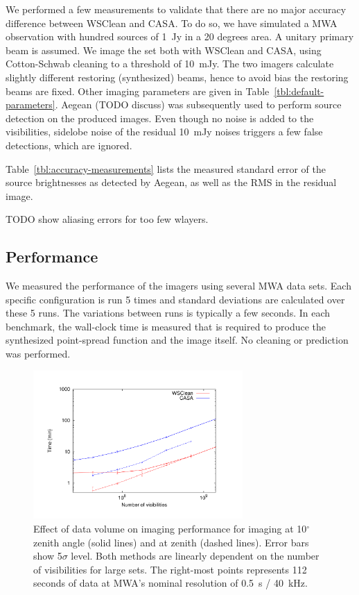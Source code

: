 \documentclass[useAMS,usenatbib]{mn2e}
\newcommand{\degree}{\ensuremath{^{\circ}}\xspace}
\begin{document}
We performed a few measurements to validate that there are no major accuracy difference between WSClean and CASA. To do so, we have simulated a MWA observation with hundred sources of 1~Jy in a 20 degrees area. A unitary primary beam is assumed. We image the set both with WSClean and CASA, using Cotton-Schwab cleaning to a threshold of 10~mJy. The two imagers calculate slightly different restoring (synthesized) beams, hence to avoid bias the restoring beams are fixed. Other imaging parameters are given in Table~\ref{tbl:default-parameters}. Aegean (TODO discuss) was subsequently used to perform source detection on the produced images. Even though no noise is added to the visibilities, sidelobe noise of the residual 10~mJy noises triggers a few false detections, which are ignored.

Table~\ref{tbl:accuracy-measurements} lists the measured standard error of the source brightnesses as detected by Aegean, as well as the RMS in the residual image.

TODO show aliasing errors for too few wlayers.

\subsection{Performance}
We measured the performance of the imagers using several MWA data sets. Each specific configuration is run 5 times and standard deviations are calculated over these 5 runs. The variations between runs is typically a few seconds. In each benchmark, the wall-clock time is measured that is required to produce the synthesized point-spread function and the image itself. No cleaning or prediction was performed.

\begin{figure}
\begin{center}
\includegraphics[width=8cm]{img/benchmark-nsamples/nsamples}
\caption{Effect of data volume on imaging performance for imaging at 10\degree zenith angle (solid lines) and at zenith (dashed lines). Error bars show 5$\sigma$ level. Both methods are linearly dependent on the number of visibilities for large sets. The right-most points represents 112 seconds of data at MWA's nominal resolution of 0.5~s / 40~kHz. }
\label{fig:timing-nsamples}
\end{center}
\end{figure}
\end{document}
